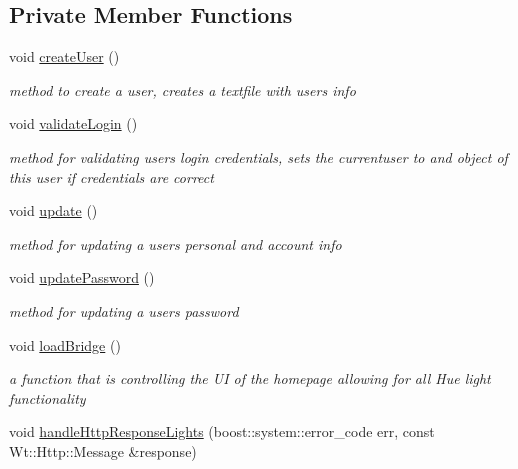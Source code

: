 \subsection*{Private Member Functions}
\begin{DoxyCompactItemize}
\item 
void \hyperlink{class_home_page_a0b1c585653227e946ba3fb0e71a4a7af}{create\+User} ()
\begin{DoxyCompactList}\small\item\em method to create a user, creates a textfile with user\textquotesingle{}s info \end{DoxyCompactList}\item 
void \hyperlink{class_home_page_af34743abfb066e71ef7b1d2f507415eb}{validate\+Login} ()
\begin{DoxyCompactList}\small\item\em method for validating user\textquotesingle{}s login credentials, sets the currentuser to and object of this user if credentials are correct \end{DoxyCompactList}\item 
void \hyperlink{class_home_page_a4dd93ce31ced15fd70992fe6ef67d28b}{update} ()
\begin{DoxyCompactList}\small\item\em method for updating a user\textquotesingle{}s personal and account info \end{DoxyCompactList}\item 
void \hyperlink{class_home_page_aa8de2797f59b77f46f0eaadaec8a63ed}{update\+Password} ()
\begin{DoxyCompactList}\small\item\em method for updating a user\textquotesingle{}s password \end{DoxyCompactList}\item 
\mbox{\label{class_home_page_ad75f2a24375568f2c231ce95ced4f1e8}} 
void \hyperlink{class_home_page_ad75f2a24375568f2c231ce95ced4f1e8}{load\+Bridge} ()
\begin{DoxyCompactList}\small\item\em a function that is controlling the UI of the homepage allowing for all Hue light functionality \end{DoxyCompactList}\item 
void \hyperlink{class_home_page_a7ca1f03912ee0763d6fd25e1c4b21eff}{handle\+Http\+Response\+Lights} (boost\+::system\+::error\+\_\+code err, const Wt\+::\+Http\+::\+Message \&response)

\end{DoxyCompactItemize}

